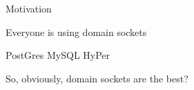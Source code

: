 
\begin{slide}{Motivation}
  \large
  \pause

  Everyone is using domain sockets
  \pause
  \vspace{0.7cm}

  \Large
  PostGres
  \hspace{0.5cm}
  MySQL
  \pause
  \hspace{0.5cm}
  HyPer

  \pause
  \large
  \vspace{1cm}
  So, obviously, domain sockets are the best?
\end{slide}
